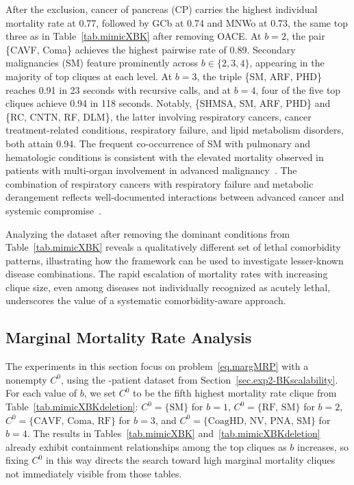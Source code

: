 After the exclusion, cancer of pancreas (CP) carries the highest
individual mortality rate at 0.77, followed by GCb at 0.74 and MNWo
at 0.73, the same top three as in Table~\ref{tab.mimicXBK} after
removing OACE. At $b=2$, the pair \{CAVF, Coma\} achieves the highest
pairwise rate of 0.89. Secondary malignancies (SM) feature prominently
across $b \in \{2,3,4\}$, appearing in the majority of top cliques at
each level. At $b=3$, the triple \{SM, ARF, PHD\} reaches 0.91 in 23
seconds with  recursive calls, and at $b=4$, four of
the five top cliques achieve 0.94 in 118 seconds. Notably, \{SHMSA,
SM, ARF, PHD\} and \{RC, CNTN, RF, DLM\}, the latter involving
respiratory cancers, cancer treatment-related conditions, respiratory
failure, and lipid metabolism disorders, both attain 0.94. The
frequent co-occurrence of SM with pulmonary and hematologic conditions
is consistent with the elevated mortality observed in patients with
multi-organ involvement in advanced
malignancy~\citep{Earle2008,Numico2015,Charlson1987}. The combination
of respiratory cancers with respiratory failure and metabolic
derangement reflects well-documented interactions between advanced
cancer and systemic compromise~\citep{Niederman2022}.

Analyzing the dataset after removing the dominant conditions from
Table~\ref{tab.mimicXBK} reveals a qualitatively different set of
lethal comorbidity patterns, illustrating how the framework can be
used to investigate lesser-known disease combinations. The rapid
escalation of mortality rates with increasing clique size, even among
diseases not individually recognized as acutely lethal, underscores
the value of a systematic comorbidity-aware approach.

\subsection{Marginal Mortality Rate Analysis}\label{sec.exp3-margMR}

The experiments in this section focus on problem~\eqref{eq.margMRP}
with a nonempty $C^0$, using the -patient dataset
from Section~\ref{sec.exp2-BKscalability}. For each value of $b$, we
set $C^0$ to be the fifth highest mortality rate clique from
Table~\ref{tab.mimicXBKdeletion}: $C^0 = \{\text{SM}\}$ for $b=1$,
$C^0 = \{\text{RF, SM}\}$ for $b=2$, $C^0 = \{\text{CAVF, Coma,
RF}\}$ for $b=3$, and $C^0 = \{\text{CoagHD, NV, PNA, SM}\}$ for
$b=4$. The results in
Tables~\ref{tab.mimicXBK} and~\ref{tab.mimicXBKdeletion} already
exhibit containment relationships among the top cliques as $b$
increases, so fixing $C^0$ in this way directs the search toward
high marginal mortality cliques not immediately visible from those
tables.

